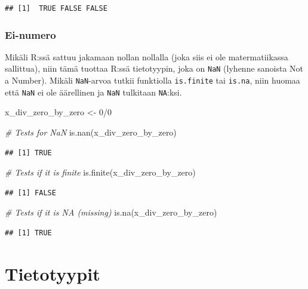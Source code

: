 \documentclass[
]{book}
\newenvironment{Shaded}{\begin{snugshade}}{\end{snugshade}}
\newcommand{\CommentTok}[1]{\textcolor[rgb]{0.56,0.35,0.01}{\textit{#1}}}
\newcommand{\DecValTok}[1]{\textcolor[rgb]{0.00,0.00,0.81}{#1}}
\newcommand{\FunctionTok}[1]{\textcolor[rgb]{0.00,0.00,0.00}{#1}}
\newcommand{\NormalTok}[1]{#1}
\newcommand{\OtherTok}[1]{\textcolor[rgb]{0.56,0.35,0.01}{#1}}
\newcommand{\SpecialCharTok}[1]{\textcolor[rgb]{0.00,0.00,0.00}{#1}}
\begin{document}
\begin{verbatim}
## [1]  TRUE FALSE FALSE
\end{verbatim}

\hypertarget{ei-numero}{%
\subsection{Ei-numero}\label{ei-numero}}

Mikäli R:ssä sattuu jakamaan nollan nollalla (joka siis ei ole matermatiikassa sallittua), niin tämä tuottaa R:ssä tietotyypin, joka on \texttt{NaN} (lyhenne sanoista Not a Number). Mikäli \texttt{NaN}-arvoa tutkii funktiolla \texttt{is.finite} tai \texttt{is.na}, niin huomaa että \texttt{NaN} ei ole äärellinen ja \texttt{NaN} tulkitaan \texttt{NA}:ksi.

\begin{Shaded}
\begin{Highlighting}[]
\NormalTok{x\_div\_zero\_by\_zero }\OtherTok{\textless{}{-}} \DecValTok{0}\SpecialCharTok{/}\DecValTok{0}

\CommentTok{\# Tests for NaN}
\FunctionTok{is.nan}\NormalTok{(x\_div\_zero\_by\_zero)}
\end{Highlighting}
\end{Shaded}

\begin{verbatim}
## [1] TRUE
\end{verbatim}

\begin{Shaded}
\begin{Highlighting}[]
\CommentTok{\# Tests if it is finite}
\FunctionTok{is.finite}\NormalTok{(x\_div\_zero\_by\_zero)}
\end{Highlighting}
\end{Shaded}

\begin{verbatim}
## [1] FALSE
\end{verbatim}

\begin{Shaded}
\begin{Highlighting}[]
\CommentTok{\# Tests if it is NA (missing)}
\FunctionTok{is.na}\NormalTok{(x\_div\_zero\_by\_zero)}
\end{Highlighting}
\end{Shaded}

\begin{verbatim}
## [1] TRUE
\end{verbatim}

\hypertarget{data_types}{%
\chapter{Tietotyypit}\label{data_types}}
\end{document}
